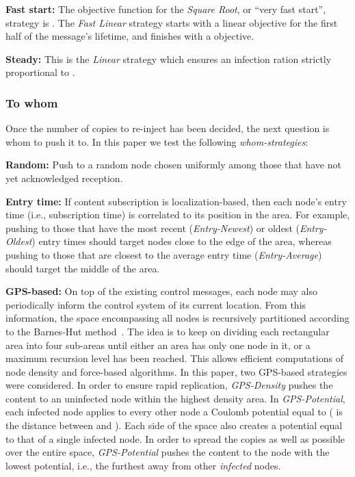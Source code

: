 \documentclass[preprint]{elsarticle}
\begin{document}
\smallskip\noindent\textbf{Fast start:} The objective function for the \textit{Square Root}, or ``very fast start'', strategy is . The \textit{Fast Linear} strategy starts with a  linear objective for the first half of the message's lifetime, and finishes with a  objective.

\smallskip\noindent\textbf{Steady:} This is the \textit{Linear} strategy which ensures an infection ration strictly proportional to .

\subsubsection{To whom}
\label{subsubsec:whom}

Once the number of copies to re-inject has been decided, the next question is whom to push it to. In this paper we test the following \textit{whom-strategies}:

\smallskip\noindent\textbf{Random:} Push to a random node chosen uniformly among those that have not yet acknowledged reception.

\smallskip\noindent\textbf{Entry time:} If content subscription is localization-based, then each node's entry time (i.e., subscription time) is correlated to its position in the area. For example, pushing to those that have the most recent (\textit{Entry-Newest}) or oldest (\textit{Entry-Oldest}) entry times should target nodes close to the edge of the area, whereas pushing to those that are closest to the average entry time (\textit{Entry-Average}) should target the middle of the area.

\smallskip\noindent\textbf{GPS-based:} On top of the existing control messages, each node may also periodically inform the control system of its current location. From this information, the space encompassing all nodes is recursively partitioned according to the Barnes-Hut method~\cite{barneshut86}. The idea is to keep on dividing each rectangular area into four sub-areas until either an area has only one node in it, or a maximum recursion level has been reached. This allows efficient computations of node density and force-based algorithms. In this paper, two GPS-based strategies were considered. In order to ensure rapid replication, \textit{GPS-Density} pushes the content to an uninfected node within the highest density area. In \textit{GPS-Potential}, each infected node  applies to every other node  a Coulomb potential equal to  ( is the distance between  and ). Each side of the space also creates a potential equal to that of a single infected node. In order to spread the copies as well as possible over the entire space, \textit{GPS-Potential} pushes the content to the node with the lowest potential, i.e., the furthest away from other \emph{infected} nodes.
\end{document}

